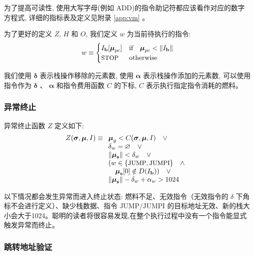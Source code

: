 \documentclass[9pt,oneside]{amsart}
\begin{document}
\begin{multicols}{2}
为了提高可读性, 使用大写字母(例如 {\small ADD})的指令助记符都应该看作对应的数字方程式, 详细的指标表及定义见附录 \ref{app:vm} 。

为了更好的定义 $Z$, $H$ 和 $O$, 我们定义 $w$ 为当前待执行的指令:
\begin{equation}\label{eq:currentoperation}
w \equiv \begin{cases} I_\mathbf{b}[\boldsymbol{\mu}_{pc}] & \text{if} \quad \boldsymbol{\mu}_{pc} < \lVert I_\mathbf{b} \rVert \\
\text{\small STOP} & \text{otherwise}
\end{cases}
\end{equation}

我们使用 $\mathbf{\delta}$ 表示栈操作移除的元素数, 使用 $\mathbf{\alpha}$ 表示栈操作添加的元素数, 可以使用指令作为  $\mathbf{\delta}$ 、 $\mathbf{\alpha}$ 和指令费用函数 $C$ 的下标, $C$ 表示执行指定指令消耗的燃料。

\subsubsection{异常终止}

异常终止函数 $Z$ 定义如下:
\begin{equation}
Z(\boldsymbol{\sigma}, \boldsymbol{\mu}, I) \equiv
\begin{array}[t]{l}
\boldsymbol{\mu}_g < C(\boldsymbol{\sigma}, \boldsymbol{\mu}, I) \quad \vee \\
\mathbf{\delta}_w = \varnothing \quad \vee \\
\lVert\boldsymbol{\mu}_\mathbf{s}\rVert < \mathbf{\delta}_w \quad \vee \\
( w \in \{ \text{\small JUMP}, \text{\small JUMPI} \} \quad \wedge \\ \quad \boldsymbol{\mu}_\mathbf{s}[0] \notin D(I_\mathbf{b}) ) \quad \vee \\
\lVert\boldsymbol{\mu}_\mathbf{s}\rVert - \mathbf{\delta}_w + \mathbf{\alpha}_w > 1024 \quad
\end{array}
\end{equation}


以下情况都会发生异常而进入终止状态: 燃料不足、无效指令（无效指令的 $\delta$ 下角标不会进行定义）、缺少栈数据、指令 {\small JUMP}/{\small JUMPI} 的目标地址无效、新的栈大小会大于1024。聪明的读者将很容易发现,在整个执行过程中没有一个指令能显式触发异常而终止。


\subsubsection{跳转地址验证}


\end{multicols}
\end{document}
